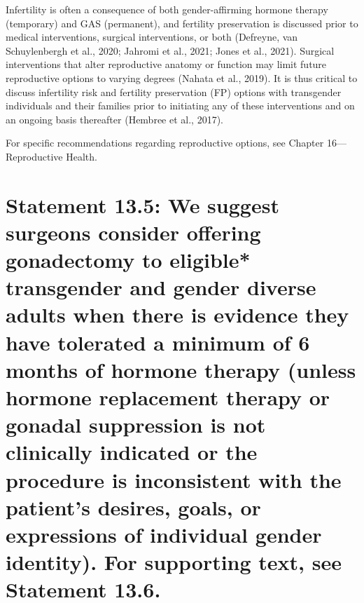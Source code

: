 \documentclass[
]{book}
\begin{document}
Infertility is often a consequence of both
gender-affirming hormone therapy (temporary)
and GAS (permanent), and fertility preservation
is discussed prior to medical interventions, surgical interventions, or both (Defreyne, van
Schuylenbergh et al., 2020; Jahromi et al., 2021;
Jones et al., 2021). Surgical interventions that
alter reproductive anatomy or function may limit
future reproductive options to varying degrees
(Nahata et al., 2019). It is thus critical to discuss
infertility risk and fertility preservation (FP)
options with transgender individuals and their
families prior to initiating any of these interventions and on an ongoing basis thereafter (Hembree
et al., 2017).

For specific recommendations regarding reproductive options, see Chapter 16---Reproductive Health.

\hypertarget{statement-13.5-we-suggest-surgeons-consider-offering-gonadectomy-to-eligible-transgender-and-gender-diverse-adults-when-there-is-evidence-they-have-tolerated-a-minimum-of-6-months-of-hormone-therapy-unless-hormone-replacement-therapy-or-gonadal-suppression-is-not-clinically-indicated-or-the-procedure-is-inconsistent-with-the-patients-desires-goals-or-expressions-of-individual-gender-identity.-for-supporting-text-see-statement-13.6.}{%
\section*{Statement 13.5: We suggest surgeons consider offering gonadectomy to eligible* transgender and gender diverse adults when there is evidence they have tolerated a minimum of 6 months of hormone therapy (unless hormone replacement therapy or gonadal suppression is not clinically indicated or the procedure is inconsistent with the patient's desires, goals, or expressions of individual gender identity). For supporting text, see Statement 13.6.}\label{statement-13.5-we-suggest-surgeons-consider-offering-gonadectomy-to-eligible-transgender-and-gender-diverse-adults-when-there-is-evidence-they-have-tolerated-a-minimum-of-6-months-of-hormone-therapy-unless-hormone-replacement-therapy-or-gonadal-suppression-is-not-clinically-indicated-or-the-procedure-is-inconsistent-with-the-patients-desires-goals-or-expressions-of-individual-gender-identity.-for-supporting-text-see-statement-13.6.}}
\end{document}
